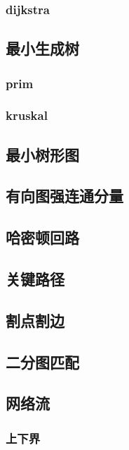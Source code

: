 \documentclass[10pt]{article}
\begin{document}
\subsubsection{dijkstra}

\subsection{最小生成树}
\subsubsection{prim}
%
\subsubsection{kruskal}

\subsection{最小树形图}


\subsection{有向图强连通分量}


\subsection{哈密顿回路}


\subsection{关键路径}

\subsection{割点割边}

\subsection{二分图匹配}
\subsection{网络流}
\subsubsection{上下界}

\end{document}
